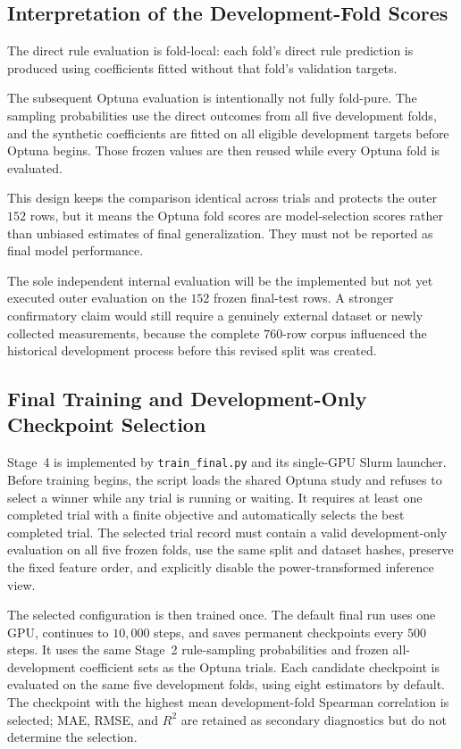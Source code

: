 \documentclass{article}
\begin{document}
\subsection{Interpretation of the Development-Fold Scores}
\label{sec:epit-pipeline-score-interpretation}

The direct rule evaluation is fold-local: each fold's direct rule prediction
is produced using coefficients fitted without that fold's validation targets.

The subsequent Optuna evaluation is intentionally not fully fold-pure. The
sampling probabilities use the direct outcomes from all five development
folds, and the synthetic coefficients are fitted on all eligible development
targets before Optuna begins. Those frozen values are then reused while every
Optuna fold is evaluated.

This design keeps the comparison identical across trials and protects the
outer \(152\) rows, but it means the Optuna fold scores are model-selection
scores rather than unbiased estimates of final generalization. They must not
be reported as final model performance.

The sole independent internal evaluation will be the implemented but not yet
executed outer evaluation on the \(152\) frozen final-test rows. A stronger
confirmatory claim would still require a genuinely external dataset or newly
collected measurements, because the complete \(760\)-row corpus influenced the
historical development process before this revised split was created.

\subsection{Final Training and Development-Only Checkpoint Selection}
\label{sec:epit-final-training}

Stage~4 is implemented by \texttt{train\_final.py} and its single-GPU Slurm
launcher. Before training begins, the script loads the shared Optuna study and
refuses to select a winner while any trial is running or waiting. It requires
at least one completed trial with a finite objective and automatically selects
the best completed trial. The selected trial record must contain a valid
development-only evaluation on all five frozen folds, use the same split and
dataset hashes, preserve the fixed feature order, and explicitly disable the
power-transformed inference view.

The selected configuration is then trained once. The default final run uses
one GPU, continues to \(10{,}000\) steps, and saves permanent checkpoints every
\(500\) steps. It uses the same Stage~2 rule-sampling probabilities and frozen
all-development coefficient sets as the Optuna trials. Each candidate
checkpoint is evaluated on the same five development folds, using eight
estimators by default. The checkpoint with the highest mean development-fold
Spearman correlation is selected; MAE, RMSE, and \(R^2\) are retained as
secondary diagnostics but do not determine the selection.
\end{document}
